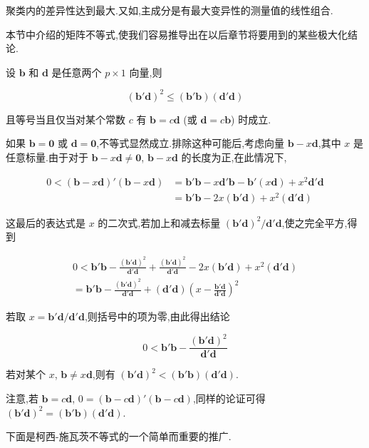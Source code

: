 
聚类内的差异性达到最大.又如,主成分是有最大变异性的测量值的线性组合.

本节中介绍的矩阵不等式,使我们容易推导出在以后章节将要用到的某些极大化结论.

 设 $\bm{b}$ 和 $\bm{d}$ 是任意两个 $p \times 1$ 向量,则

\label{eq:2-48}
\begin{equation}
(\bm{b}'\bm{d})^2 \leqslant (\bm{b}'\bm{b})(\bm{d}'\bm{d}) \tag{2-48}
\end{equation}

且等号当且仅当对某个常数 $c$ 有 $\bm{b} = c\bm{d}$ (或 $\bm{d} = c\bm{b}$) 时成立.

 如果 $\bm{b} = \bm{0}$ 或 $\bm{d} = \bm{0}$,不等式显然成立.排除这种可能后,考虑向量 $\bm{b} - x\bm{d}$,其中 $x$ 是任意标量.由于对于 $\bm{b} - x\bm{d} \neq \bm{0}$, $\bm{b} - x\bm{d}$ 的长度为正,在此情况下,

\[
\begin{aligned}
0 < (\bm{b} - x\bm{d})'(\bm{b} - x\bm{d}) &= \bm{b}'\bm{b} - x\bm{d}'\bm{b} - \bm{b}'(x\bm{d}) + x^2\bm{d}'\bm{d} \\
&= \bm{b}'\bm{b} - 2x(\bm{b}'\bm{d}) + x^2(\bm{d}'\bm{d})
\end{aligned}
\]

这最后的表达式是 $x$ 的二次式,若加上和减去标量 $(\bm{b}'\bm{d})^2/\bm{d}'\bm{d}$,使之完全平方,得到

\[
\begin{aligned}
0 < \bm{b}'\bm{b} - \frac{(\bm{b}'\bm{d})^2}{\bm{d}'\bm{d}} + \frac{(\bm{b}'\bm{d})^2}{\bm{d}'\bm{d}} - 2x(\bm{b}'\bm{d}) + x^2(\bm{d}'\bm{d}) \\
= \bm{b}'\bm{b} - \frac{(\bm{b}'\bm{d})^2}{\bm{d}'\bm{d}} + (\bm{d}'\bm{d})\left(x - \frac{\bm{b}'\bm{d}}{\bm{d}'\bm{d}}\right)^2
\end{aligned}
\]

若取 $x = \bm{b}'\bm{d}/\bm{d}'\bm{d}$,则括号中的项为零,由此得出结论

\[
0 < \bm{b}'\bm{b} - \frac{(\bm{b}'\bm{d})^2}{\bm{d}'\bm{d}}
\]

若对某个 $x$, $\bm{b} \neq x\bm{d}$,则有 $(\bm{b}'\bm{d})^2 < (\bm{b}'\bm{b})(\bm{d}'\bm{d})$.

注意,若 $\bm{b} = c\bm{d}$, $0 = (\bm{b} - c\bm{d})'(\bm{b} - c\bm{d})$,同样的论证可得 $(\bm{b}'\bm{d})^2 = (\bm{b}'\bm{b})(\bm{d}'\bm{d})$.

下面是柯西-施瓦茨不等式的一个简单而重要的推广.

